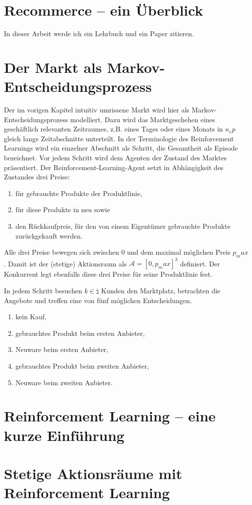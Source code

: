 \section{Recommerce -- ein Überblick}
In dieser Arbeit werde ich ein Lehrbuch \cite{Sutton1998} und ein Paper \cite{DBLP:journals/corr/abs-1712-01815} zitieren.

\section{Der Markt als Markov-Entscheidungsprozess}
Der im vorigen Kapitel intuitiv umrissene Markt wird hier als Markov-Entscheidungsprozess modelliert.
Dazu wird das Marktgeschehen eines geschäftlich relevanten Zeitraumes, z.B. eines Tages oder eines Monats in $n_ep$ gleich lange Zeitabschnitte unterteilt.
In der Terminologie des Reinforcement Learnings wird ein einzelner Abschnitt als Schritt, die Gesamtheit als Episode bezeichnet.
Vor jedem Schritt wird dem Agenten der Zustand des Marktes präsentiert.
Der Reinforcement-Learning-Agent setzt in Abhängigkeit des Zustandes drei Preise:
\begin{enumerate}
    \item für gebrauchte Produkte der Produktlinie,
    \item für diese Produkte in neu sowie
    \item den Rückkaufpreis, für den von einem Eigentümer gebrauchte Produkte zurückgekauft werden.
\end{enumerate}
Alle drei Preise bewegen sich zwischen 0 und dem maximal möglichen Preis $p_max$.
Damit ist der (stetige) Aktionsraum als $\mathcal{A}=[0, p_max]^3$ definiert.
Der Konkurrent legt ebenfalls diese drei Preise für seine Produktlinie fest.

In jedem Schritt besuchen $k \in \natural$ Kunden den Marktplatz, betrachten die Angebote und treffen eine von fünf möglichen Entscheidungen.
\begin{enumerate}
    \item kein Kauf,
    \item gebrauchtes Produkt beim ersten Anbieter,
    \item Neuware beim ersten Anbieter,
    \item gebrauchtes Produkt beim zweiten Anbieter,
    \item Neuware beim zweiten Anbieter.
\end{enumerate}

\section{Reinforcement Learning -- eine kurze Einführung}

\section{Stetige Aktionsräume mit Reinforcement Learning}
